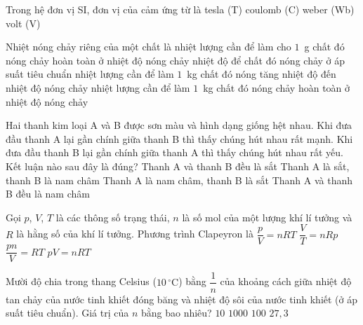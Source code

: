 	\begin{ex}%
		Trong hệ đơn vị SI, đơn vị của cảm ứng từ là
		\choice
		{\True tesla (T)}
		{coulomb (C)}
		{weber (Wb)}
		{volt (V)}
	\end{ex}

	\begin{ex}%
		Nhiệt nóng chảy riêng của một chất là
		\choice
		{nhiệt lượng cần để làm cho $1$~g chất đó nóng chảy hoàn toàn ở nhiệt độ nóng chảy}
		{nhiệt độ để chất đó nóng chảy ở áp suất tiêu chuẩn}
		{nhiệt lượng cần để làm $1$~kg chất đó nóng tăng nhiệt độ đến nhiệt độ nóng chảy}
		{\True nhiệt lượng cần để làm $1$~kg chất đó nóng chảy hoàn toàn ở nhiệt độ nóng chảy}
	\end{ex}

	\begin{ex}%
		Hai thanh kim loại A và B được sơn màu và hình dạng giống hệt nhau. Khi đưa đầu thanh A lại gần chính giữa thanh B thì thấy chúng hút nhau rất mạnh. Khi đưa đầu thanh B lại gần chính giữa thanh A thì thấy chúng hút nhau rất yếu. Kết luận nào sau đây là đúng?
		\choice
		{Thanh A và thanh B đều là sắt}
		{Thanh A là sắt, thanh B là nam châm}
		{\True Thanh A là nam châm, thanh B là sắt}
		{Thanh A và thanh B đều là nam châm}
	\end{ex}

	\begin{ex}%
		Gọi $p$, $V$, $T$ là các thông số trạng thái, $n$ là số mol của một lượng khí lí tưởng và $R$ là hằng số của khí lí tưởng. Phương trình Clapeyron là
		\choice
		{$\dfrac{p}{V}=nRT$}
		{$\dfrac{V}{T}=nRp$}
		{$\dfrac{pn}{V}=RT$}
		{\True $pV=nRT$}
	\end{ex}

	\begin{ex}%
		Mười độ chia trong thang Celsius ($10\,^\circ\text{C}$) bằng $\dfrac{1}{n}$ của khoảng cách giữa nhiệt độ tan chảy của nước tinh khiết đóng băng và nhiệt độ sôi của nước tinh khiết (ở áp suất tiêu chuẩn). Giá trị của $n$ bằng bao nhiêu?
		\choice
		{\True $10$}
		{$1000$}
		{$100$}
		{$27{,}3$}
	\end{ex}

